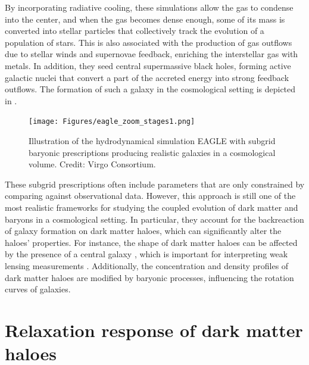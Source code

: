 By incorporating radiative cooling, these simulations allow the gas to condense into the center, and when the gas becomes dense enough, some of its mass is converted into stellar particles that collectively track the evolution of a population of stars. This is also associated with the production of gas outflows due to stellar winds and supernovae feedback, enriching the interstellar gas with metals. In addition, they seed central supermassive black holes, forming active galactic nuclei that convert a part of the accreted energy into strong feedback outflows. The formation of such a galaxy in the cosmological setting is depicted in .

\begin{figure}
\centering
\texttt{[image: Figures/eagle\_zoom\_stages1.png]}
\caption{Illustration of the hydrodynamical simulation EAGLE with subgrid baryonic prescriptions producing realistic galaxies in a cosmological volume. Credit: Virgo Consortium.}
\label{fig:illustrate-sim-eagle}
\end{figure}

These subgrid prescriptions often include parameters that are only constrained by comparing against observational data. However, this approach is still one of the most realistic frameworks for studying the coupled evolution of dark matter and baryons in a cosmological setting. In particular, they account for the backreaction of galaxy formation on dark matter haloes, which can significantly alter the haloes' properties. For instance, the shape of dark matter haloes can be affected by the presence of a central galaxy \citep{2010MNRAS.407..435A,2021MNRAS.501.5679C}, which is important for interpreting weak lensing measurements \citep{2021A&A...647A.185G}. Additionally, the concentration and density profiles of dark matter haloes are modified by baryonic processes, influencing the rotation curves of galaxies.


\section{Relaxation response of dark matter haloes}


